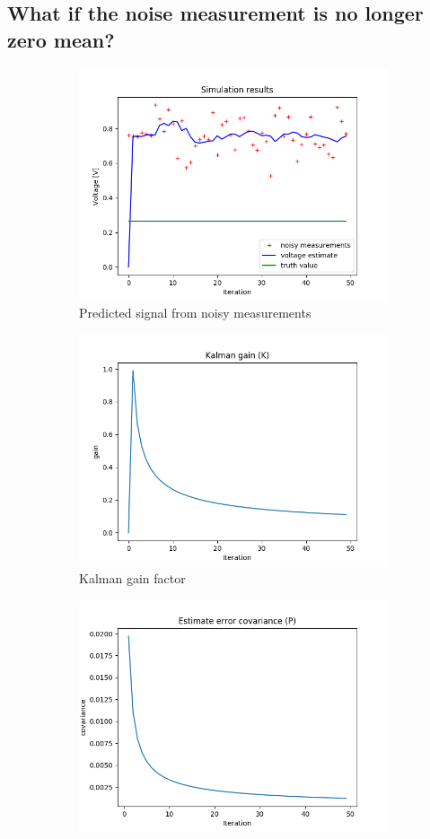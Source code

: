 \documentclass{article}
\begin{document}
    \subsection{What if the noise measurement is no longer zero mean?}
    \begin{figure}[H]
        \begin{subfigure} {.5\textwidth}  
            \centering 
            \includegraphics[width=0.6\linewidth]{./img/nc_.png}
            \caption{Predicted signal from noisy measurements }
        \end{subfigure}
        \begin{subfigure}{.5\textwidth}            
            \centering
            \includegraphics[width=0.6\linewidth]{./img/nc_K.png}
            \caption{Kalman gain factor}
        \end{subfigure}
        \begin{subfigure} {.5\textwidth}  
            \centering 
            \includegraphics[width=0.6\linewidth]{./img/nc_P.png}

\end{subfigure}
\end{figure}
\end{document}
